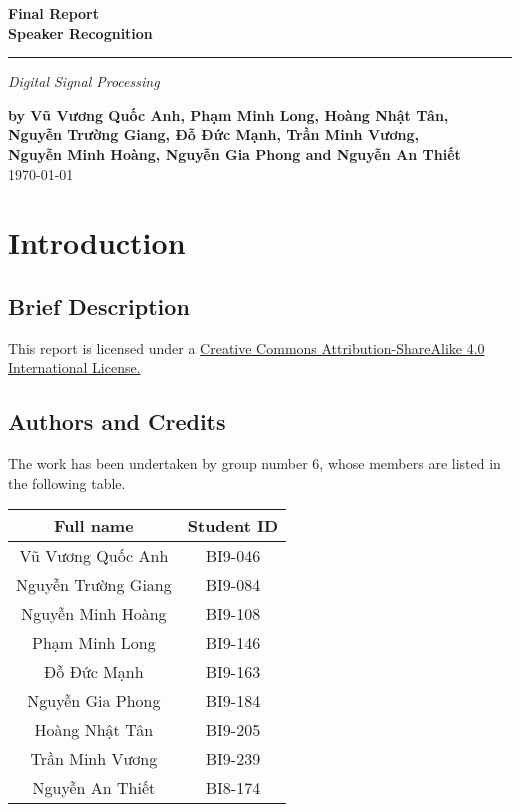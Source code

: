 \documentclass[a4paper,12pt]{article}
\begin{document}
\setcounter{page}{0}
\thispagestyle{empty}
\begin{flushright}
  \setlength{\baselineskip}{1.4\baselineskip}
\textbf{\Huge Final Report\\Speaker Recognition}
  \noindent\rule{\textwidth}{5pt}
  \emph{\Large Digital Signal Processing}

  \textbf{by Vũ Vương Quốc Anh, Phạm Minh Long, Hoàng Nhật Tân,\\
          Nguyễn Trường Giang, Đỗ Đức Mạnh, Trần Minh Vương,\\
          Nguyễn Minh Hoàng, Nguyễn Gia Phong and Nguyễn An Thiết\\}
  \today
\end{flushright}
\pagebreak

\tableofcontents
\pagebreak

\section{Introduction}
\subsection{Brief Description}
This report is licensed under a
\href{http://creativecommons.org/licenses/by-sa/4.0/}{Creative Commons
Attribution-ShareAlike 4.0 International License.}

\subsection{Authors and Credits}
The work has been undertaken by group number 6, whose members are listed
in the following table.
\begin{center}
  \begin{tabular}{c c}
    \toprule
    Full name & Student ID\\
    \midrule
    Vũ Vương Quốc Anh & BI9-046\\
    Nguyễn Trường Giang & BI9-084\\
    Nguyễn Minh Hoàng & BI9-108\\
    Phạm Minh Long & BI9-146\\
    Đỗ Đức Mạnh & BI9-163\\
    Nguyễn Gia Phong & BI9-184\\
    Hoàng Nhật Tân & BI9-205\\
    Trần Minh Vương & BI9-239\\
    Nguyễn An Thiết & BI8-174\\
    \bottomrule
  \end{tabular}
\end{center}
\end{document}
